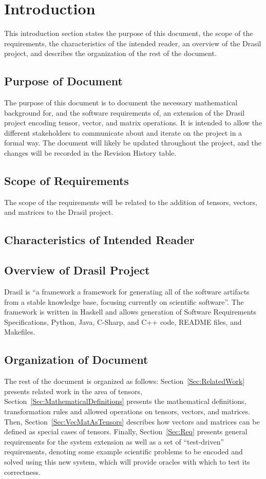 \documentclass[12pt]{article}
\begin{document}

\section{Introduction}
This introduction section states the purpose of this document, the scope of 
the requirements, the characteristics of the intended reader, an overview of the
Drasil project, and describes the organization of the rest of the document.

\subsection{Purpose of Document}
The purpose of this document is to document the necessary mathematical background for,
and the software requirements of, an extension of the Drasil project encoding tensor,
vector, and matrix operations. It is intended to allow the different stakeholders to
communicate about and iterate on the project in a formal way. The document will likely
be updated throughout the project, and the changes will be recorded in the Revision
History table.

\subsection{Scope of Requirements} 
The scope of the requirements will be related to the addition of tensors, vectors,
and matrices to the Drasil project.

\subsection{Characteristics of Intended Reader}\label{sec_IntendedReader}

\subsection{Overview of Drasil Project}
Drasil is ``a framework a framework for generating all of the software artifacts from 
a stable knowledge base, focusing currently on scientific software''. The framework
is written in Haskell and allows generation of Software Requirements Specifications,
Python, Java, C-Sharp, and C++ code, README files, and Makefiles.

\subsection{Organization of Document}
The rest of the document is organized as follows: Section~\ref{Sec:RelatedWork} 
presents related work in the area of tensors, Section~\ref{Sec:MathematicalDefinitions}
presents the mathematical definitions, transformation rules and allowed operations
on tensors, vectors, and matrices. Then, Section~\ref{Sec:VecMatAsTensors} describes
how vectors and matrices can be defined as special cases of tensors. Finally, 
Section~\ref{Sec:Req} presents general requirements for the system extension as well as
a set of ``test-driven'' requirements, denoting some example scientific problems
to be encoded and solved using this new system, which will provide oracles with which
to test its correctness.
\end{document}

